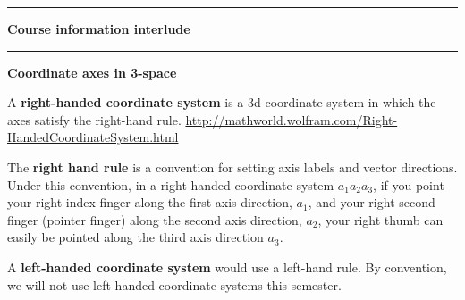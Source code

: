 \documentclass[12pt,letterpaper,noanswers]{exam}
\begin{document}
% 

\vspace{0.2cm}
\hrule
\vspace{0.2cm}

\noindent\textbf{Course information interlude}

\vspace{0.2cm}
\hrule
\vspace{0.2cm}
\noindent\textbf{Coordinate axes in 3-space}

\begin{tcolorbox}
A \textbf{right-handed coordinate system} is a 3d coordinate system in which the axes satisfy the right-hand rule.  \url{http://mathworld.wolfram.com/Right-HandedCoordinateSystem.html}

The \textbf{right hand rule} is a convention for setting axis labels and vector directions.  Under this convention, in a right-handed coordinate system $a_1a_2a_3$, if you point your right index finger along the first axis direction, $a_1$, and your right second finger (pointer finger) along the second axis direction, $a_2$, your right thumb can easily be pointed along the third axis direction $a_3$.

A \textbf{left-handed coordinate system} would use a left-hand rule.  By convention, we will not use left-handed coordinate systems this semester.
\end{tcolorbox}
\end{document}
